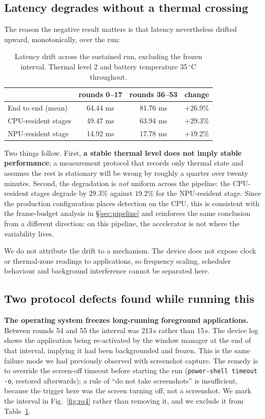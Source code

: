 \documentclass[conference]{IEEEtran}
\begin{document}
\subsection{Latency degrades without a thermal crossing}

The reason the negative result matters is that latency nevertheless drifted
upward, monotonically, over the run:

\begin{table}[t]
\caption{Latency drift across the sustained run, excluding the frozen interval.
Thermal level 2 and battery temperature 35\,$^\circ$C throughout.}
\label{tab:drift}
\centering
\begin{tabular}{lccc}
\toprule
& rounds 0--17 & rounds 36--53 & change \\
\midrule
End to end (mean) & 64.44 ms & 81.76 ms & $+26.9\%$ \\
CPU-resident stages & 49.47 ms & 63.94 ms & $+29.3\%$ \\
NPU-resident stage & 14.92 ms & 17.78 ms & $+19.2\%$ \\
\bottomrule
\end{tabular}
\end{table}

Two things follow. First, \textbf{a stable thermal level does not imply stable
performance}; a measurement protocol that records only thermal state and assumes
the rest is stationary will be wrong by roughly a quarter over twenty minutes.
Second, the degradation is \emph{not} uniform across the pipeline: the
CPU-resident stages degrade by $29.3\%$ against $19.2\%$ for the NPU-resident
stage. Since the production configuration places detection on the CPU, this is
consistent with the frame-budget analysis in \S\ref{sec:pipeline} and reinforces
the same conclusion from a different direction: on this pipeline, the
accelerator is not where the variability lives.

We do not attribute the drift to a mechanism. The device does not expose clock
or thermal-zone readings to applications, so frequency scaling, scheduler
behaviour and background interference cannot be separated here.

\subsection{Two protocol defects found while running this}

\textbf{The operating system freezes long-running foreground applications.}
Between rounds 54 and 55 the interval was 213\,s rather than 15\,s. The device
log shows the application being re-activated by the window manager at the end of
that interval, implying it had been backgrounded and frozen. This is the same
failure mode we had previously observed with screenshot capture. The remedy is
to override the screen-off timeout before starting the run
(\texttt{power-shell timeout -o}, restored afterwards); a rule of ``do not take
screenshots'' is insufficient, because the trigger here was the screen turning
off, not a screenshot. We mark the interval in Fig.~\ref{fig:rq4} rather than
removing it, and we exclude it from Table~\ref{tab:drift}.
\end{document}
